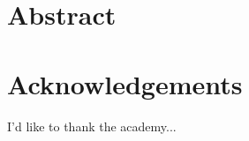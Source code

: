 \documentclass[oneside, letterpaper, 12pt, oldfontcommands]{memoir}
\begin{document}
\frontmatter


\thetitlepage
\clearpage

\thecopyrightpage
\cleardoublepage

\setcounter{page}{1}

\section{Abstract}
\uwabstract
\cleardoublepage

\section{Acknowledgements}
I'd like to thank the academy...
\clearpage

\tableofcontents* %

\mainmatter










\footnotesize {}

\end{document}
